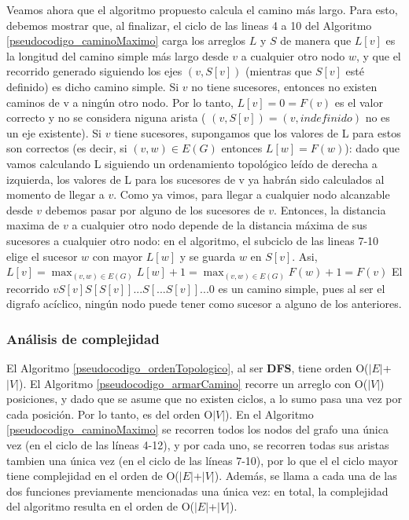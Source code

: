 Veamos ahora que el algoritmo propuesto calcula el camino m\'as largo. 
Para esto, debemos mostrar que, al finalizar,  el ciclo de las lineas 4 a 10 del Algoritmo \ref{pseudocodigo_caminoMaximo} carga los arreglos $L$ y $S$ de manera que $L[v]$ es la longitud del camino simple m\'as largo desde $v$ a cualquier otro nodo $w$, y que el recorrido generado siguiendo los ejes $(v, S[v])$ (mientras que $S[v]$ est\'e definido) es dicho camino simple. 
Si $v$ no tiene sucesores, entonces no existen caminos de v a ning\'un otro nodo. 
Por lo tanto, $L[v] = 0 = F(v)$ es el valor correcto y no se considera niguna arista ( $(v, S[v]) = (v, indefinido)$ no es un eje existente). 
Si $v$ tiene sucesores, supongamos que los valores de L para estos son correctos (es decir, si $(v, w) \in  E(G)$ entonces $L[w] = F(w)$):
dado que vamos calculando L siguiendo un ordenamiento topol\'ogico le\'ido de derecha a izquierda, los valores de L para los sucesores de v ya habr\'an sido calculados al momento de llegar a $v$. 
Como ya vimos, para llegar a cualquier nodo alcanzable desde $v$ debemos pasar por alguno de los sucesores de $v$.  Entonces, la distancia maxima de $v$ a cualquier otro nodo depende de la distancia m\'axima de sus sucesores a cualquier otro nodo: en el algoritmo, el subciclo de las lineas 7-10 elige el sucesor $w$ con mayor $L[w]$ y se guarda $w$ en $S[v]$. Asi, $L[v] = \max_{(v,w) \in E(G)}{L[w]+1} = \max_{(v,w) \in E(G)}{F(w) +1} = F(v) $
El recorrido $vS[v]S[S[v]]...S[...S[v]]...0$ es un camino simple, pues al ser el digrafo ac\'iclico, ning\'un nodo puede tener como sucesor a alguno de los anteriores.


\subsubsection{An\'alisis de complejidad}
 
El Algoritmo \ref{pseudocodigo_ordenTopologico}, al ser \textbf{DFS}, tiene orden O($\left|{E}\right|$+$\left|{V}\right|$).
El Algoritmo \ref{pseudocodigo_armarCamino} recorre un arreglo con O($\left|{V}\right|$) posiciones, y dado que se asume que no existen ciclos, a lo sumo pasa una vez por cada posici\'on. Por lo tanto, es del orden O$\left|{V}\right|$).
En el Algoritmo \ref{pseudocodigo_caminoMaximo} se recorren todos los nodos del grafo una \'unica vez (en el ciclo de las l\'ineas 4-12), y por cada uno, se recorren todas sus aristas tambien una \'unica vez (en el ciclo de las l\'ineas 7-10), por lo que el el ciclo mayor tiene complejidad en el orden de O($\left|{E}\right|$+$\left|{V}\right|$). Adem\'as, se llama a cada una de las dos funciones previamente mencionadas una \'unica vez: en total, la complejidad del algoritmo resulta en el orden de O($\left|{E}\right|$+$\left|{V}\right|$).
 


